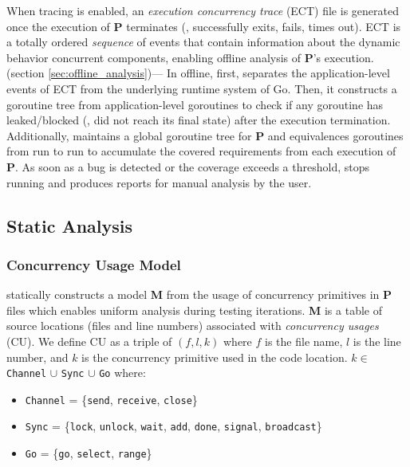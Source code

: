 %
When tracing is enabled, an \textit{execution concurrency trace} (ECT) file is generated once the execution of \textbf{P} terminates (\eg, successfully exits, fails, times out).
%
ECT is a totally ordered \textit{sequence} of events that contain information about the dynamic behavior concurrent components, enabling offline analysis of \textbf{P}'s execution.
\\
 (section \ref{sec:offline_analysis})---
In offline, \goat first, separates the application-level events of ECT from the underlying runtime system of Go.
%
Then, it constructs a goroutine tree from application-level goroutines to check if any goroutine has leaked/blocked (\ie, did not reach its final state) after the execution termination.
%
Additionally, \goat maintains a global goroutine tree for \textbf{P} and equivalences goroutines from run to run to accumulate the covered requirements from each execution of \textbf{P}.
%
As soon as a bug is detected or the coverage exceeds a threshold, \goat stops running and produces reports for manual analysis by the user.
%

\subsection{Static Analysis}
\label{sec:static_analysis}

\subsubsection{Concurrency Usage Model}
\goat statically constructs a model \textbf{M} from the usage of concurrency primitives in \textbf{P} files which enables uniform analysis during testing iterations.
%
\textbf{M} is a table of source locations (files and line numbers) associated with \textit{concurrency usages} (CU).
%
We define CU as a triple of $(f,l,k)$ where $f$ is the file name, $l$ is the line number, and $k$ is the concurrency primitive used in the code location.
$k\in$ \texttt{Channel} $\cup$ \texttt{Sync} $\cup$ \texttt{Go} where:
\begin{itemize}
  \item \texttt{Channel} = \{\texttt{send}, \texttt{receive}, \texttt{close}\}
  \item \texttt{Sync} = \{\texttt{lock}, \texttt{unlock}, \texttt{wait}, \texttt{add}, \texttt{done}, \texttt{signal}, \texttt{broadcast}\}
  \item \texttt{Go} = \{\texttt{go}, \texttt{select}, \texttt{range}\}
\end{itemize}


